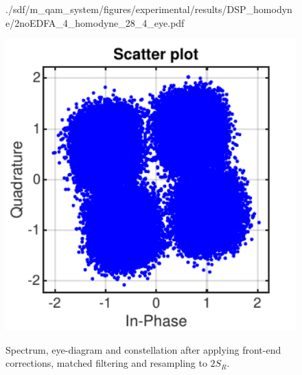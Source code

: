 \begin{figure}[H]
\begin{minipage}{0.30\textwidth}
			{./sdf/m_qam_system/figures/experimental/results/DSP_homodyne/2noEDFA_4_homodyne_28_4_eye.pdf}
			\label{fig:16GBdSpecMF}
		\end{minipage}
		\begin{minipage}{0.30\textwidth}
			\centering
			\includegraphics[width=1\textwidth]
			{./sdf/m_qam_system/figures/experimental/results/DSP_homodyne/2noEDFA_4_homodyne_28_4_const.pdf}\\
			\label{fig:16GBdSpecBefFec}
		\end{minipage}
		\caption{Spectrum, eye-diagram and constellation after applying front-end corrections, matched filtering and resampling to $2 S_R$.}
		\label{fig:16GBMFHm}
	\end{figure}


